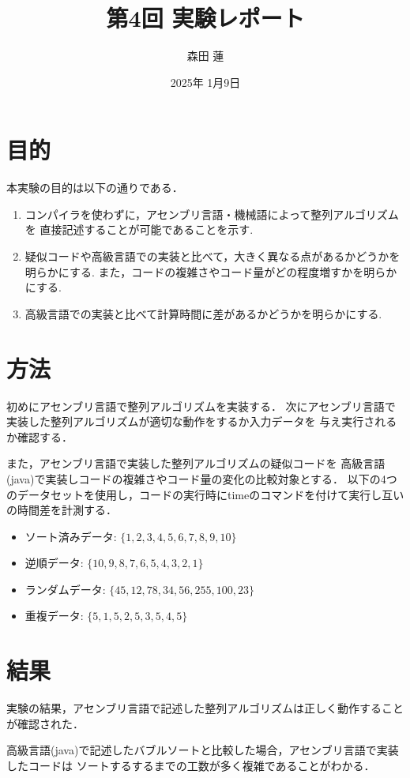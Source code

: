 \documentclass{jlreq}
\title{第4回 実験レポート}
\author{森田 蓮}
\date{2025年 1月9日}
\begin{document}
\maketitle

\section{目的}
本実験の目的は以下の通りである．
\begin{enumerate}
    \item コンパイラを使わずに，アセンブリ言語・機械語によって整列アルゴリズムを
    直接記述することが可能であることを示す.
    \item 疑似コードや高級言語での実装と比べて，大きく異なる点があるかどうかを明らかにする.
    また，コードの複雑さやコード量がどの程度増すかを明らかにする.
    \item 高級言語での実装と比べて計算時間に差があるかどうかを明らかにする.
\end{enumerate}


\section{方法}
初めにアセンブリ言語で整列アルゴリズムを実装する．
次にアセンブリ言語で実装した整列アルゴリズムが適切な動作をするか入力データを
与え実行されるか確認する．

また，アセンブリ言語で実装した整列アルゴリズムの疑似コードを
高級言語(java)で実装しコードの複雑さやコード量の変化の比較対象とする．
以下の4つのデータセットを使用し，コードの実行時にtimeのコマンドを付けて実行し互いの時間差を計測する．
\begin{itemize}
    \item ソート済みデータ: $\{1, 2, 3, 4, 5, 6, 7, 8, 9, 10\}$
    \item 逆順データ: $\{10, 9, 8, 7, 6, 5, 4, 3, 2, 1\}$
    \item ランダムデータ: $\{45, 12, 78, 34, 56, 255, 100, 23\}$
    \item 重複データ: $\{5, 1, 5, 2, 5, 3, 5, 4, 5\}$
\end{itemize}


\section{結果}
実験の結果，アセンブリ言語で記述した整列アルゴリズムは正しく動作することが確認された．

高級言語(java)で記述したバブルソートと比較した場合，アセンブリ言語で実装したコードは
ソートするするまでの工数が多く複雑であることがわかる．
\end{document}

